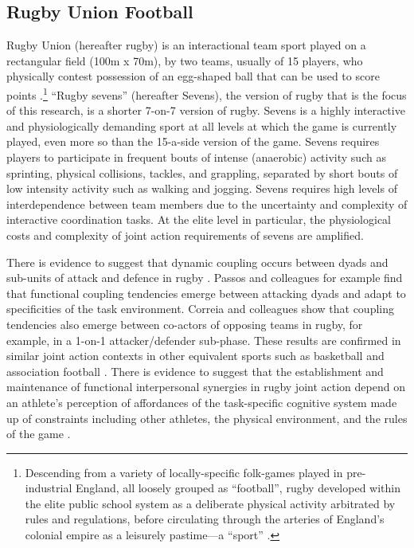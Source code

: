 \subsection{Rugby Union Football}
Rugby Union (hereafter rugby) is an interactional team sport played on a rectangular field (100m x 70m), by two teams, usually of 15 players, who physically contest possession of an egg-shaped ball that can be used to score points \citep{IRB2014}.\footnote{Descending from a variety of locally-specific folk-games played in pre-industrial England, all loosely grouped as ``football'', rugby developed within the elite public school system as a deliberate physical activity arbitrated by rules and regulations, before circulating through the arteries of England's colonial empire as a leisurely pastime—a ``sport'' \citep{Dunning2005}.}
``Rugby sevens'' (hereafter Sevens), the version of rugby that is the focus of this research, is a shorter 7-on-7 version of rugby. Sevens is a highly interactive and physiologically demanding sport at all levels at which the game is currently played, even more so than the 15-a-side version of the game.   Sevens requires players to participate in frequent bouts of intense (anaerobic) activity such as sprinting, physical collisions, tackles, and grappling, separated by short bouts of low intensity activity such as walking and jogging. Sevens requires high levels of interdependence between team members due to the uncertainty and complexity of interactive coordination tasks.  At the elite level in particular, the physiological costs and complexity of joint action requirements of sevens are amplified.

There is evidence to suggest that dynamic coupling occurs between dyads and sub-units of attack and defence in rugby \citep{Passos2011,Correia2014}.  Passos and colleagues \textcite{Passos2011} for example find that functional coupling tendencies emerge between attacking dyads and adapt to specificities of the task environment.  Correia and colleagues \textcite{Correia2014} show that coupling tendencies also emerge between co-actors of opposing teams in rugby, for example, in a 1-on-1 attacker/defender sub-phase.  These results are confirmed in similar joint action contexts in other equivalent sports such as basketball and association football \citep{Duarte2013}. There is evidence to suggest that the establishment and maintenance of functional interpersonal synergies in rugby joint action depend on an athlete's perception of affordances of the task-specific cognitive system made up of constraints including other athletes, the physical environment, and the rules of the game \citep{Passos2012}.

